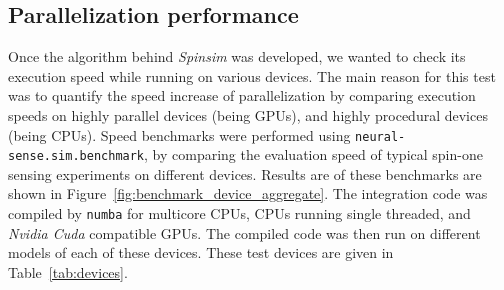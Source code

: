 \documentclass{jors}
\begin{document}
	\subsection{Parallelization performance}
		Once the algorithm behind \emph{Spinsim} was developed, we wanted to check its execution speed while running on various devices.
		The main reason for this test was to quantify the speed increase of parallelization by comparing execution speeds on highly parallel devices (being GPUs), and highly procedural devices (being CPUs).
		Speed benchmarks were performed using \texttt{neural-sense.sim.benchmark}, by comparing the evaluation speed of typical spin-one sensing experiments on different devices.
		Results are of these benchmarks are shown in Figure~\ref{fig:benchmark_device_aggregate}.
		The integration code was compiled by \texttt{numba} for multicore CPUs, CPUs running single threaded, and \emph{Nvidia Cuda} compatible GPUs.
		The compiled code was then run on different models of each of these devices.
		These test devices are given in Table~\ref{tab:devices}.
\end{document}
